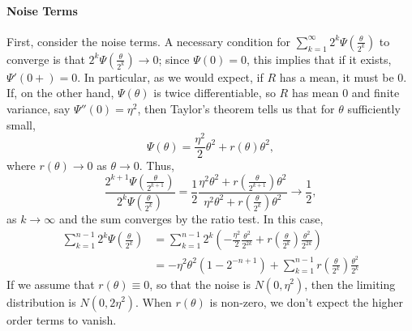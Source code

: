 \documentclass{article}
\newcommand{\1}{\mathbbm{1}}
\theoremstyle{remark}
\theoremstyle{definition}
\begin{document}
\paragraph{Noise Terms}
First, consider the noise terms.  A necessary condition for $\sum_{k=1}^{\infty} 2^{k} \Psi\left(\frac{\theta}{2^{k}}\right)$ to converge is that $2^{k} \Psi\left(\frac{\theta}{2^{k}}\right) \to 0$; since $\Psi(0) = 0$, this implies that if it exists, $\Psi'(0+) = 0$.  In particular, as we would expect, if $R$ has a mean, it must be 0.  If, on the other hand, $\Psi(\theta)$ is twice differentiable, so $R$ has mean 0 and finite variance, say $\Psi''(0) = \eta^{2}$, then Taylor's theorem tells us that for $\theta$ sufficiently small, 
\[
	\Psi(\theta) = \frac{\eta^{2}}{2} \theta^{2} + r(\theta)\theta^{2},
\]
where $r(\theta) \to 0$ as $\theta \to 0$.  Thus,
\begin{equation*}
	\frac{\textstyle 2^{k+1} \Psi\left(\frac{\theta}{2^{k+1}}\right)}{\textstyle 2^{k} \Psi\left(\frac{\theta}{2^{k}}\right)}
	= \frac{1}{2} \frac{\eta^{2} \theta^{2} + {\textstyle  r\left(\frac{\theta}{2^{k+1}}\right)}\theta^{2}}{\eta^{2} \theta^{2} + {\textstyle  r\left(\frac{\theta}{2^{k}}\right)}\theta^{2}}
	\to \frac{1}{2},
\end{equation*}
as $k \to \infty$ and the sum converges by the ratio test.  In this case,
\begin{align*}
	 \sum_{k=1}^{n-1}  {\textstyle 2^{k} \Psi\left(\frac{\theta}{2^{k}}\right)}
	 &=  \sum_{k=1}^{n-1} 2^{k} {\textstyle \left(- \frac{\eta^{2}}{2}  \frac{\theta^{2}}{2^{2k}}
		+ r\left(\frac{\theta}{2^{k}}\right)\frac{\theta^{2}}{2^{2k}}\right)}\\
	&=- \eta^{2} \theta^{2} (1 - 2^{-n+1})  + \sum_{k=1}^{n-1} {\textstyle r\left(\frac{\theta}{2^{k}}\right)\frac{\theta^{2}}{2^{k}}}
\end{align*}
If we assume that $r(\theta) \equiv 0$, so that the noise is $N(0,\eta^{2})$, then the limiting distribution is $N(0,2\eta^{2})$. When  $r(\theta)$ is non-zero, we don't expect the higher order terms to vanish.
\end{document}

